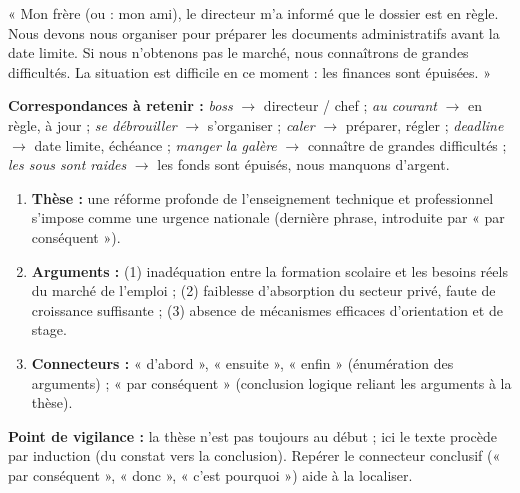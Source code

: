 \documentclass[11pt]{article}
\begin{document}
\begin{corrige}
« Mon frère (ou : mon ami), le directeur m'a informé que le dossier est en règle. Nous devons nous organiser pour préparer les documents administratifs avant la date limite. Si nous n'obtenons pas le marché, nous connaîtrons de grandes difficultés. La situation est difficile en ce moment : les finances sont épuisées. »

\textbf{Correspondances à retenir :} \emph{boss} $\rightarrow$ directeur / chef ; \emph{au courant} $\rightarrow$ en règle, à jour ; \emph{se débrouiller} $\rightarrow$ s'organiser ; \emph{caler} $\rightarrow$ préparer, régler ; \emph{deadline} $\rightarrow$ date limite, échéance ; \emph{manger la galère} $\rightarrow$ connaître de grandes difficultés ; \emph{les sous sont raides} $\rightarrow$ les fonds sont épuisés, nous manquons d'argent.
\end{corrige}

\begin{corrige}
\begin{enumerate}
    \item \textbf{Thèse :} une réforme profonde de l'enseignement technique et professionnel s'impose comme une urgence nationale (dernière phrase, introduite par « par conséquent »).
    \item \textbf{Arguments :} (1) inadéquation entre la formation scolaire et les besoins réels du marché de l'emploi ; (2) faiblesse d'absorption du secteur privé, faute de croissance suffisante ; (3) absence de mécanismes efficaces d'orientation et de stage.
    \item \textbf{Connecteurs :} « d'abord », « ensuite », « enfin » (énumération des arguments) ; « par conséquent » (conclusion logique reliant les arguments à la thèse).
\end{enumerate}
\textbf{Point de vigilance :} la thèse n'est pas toujours au début ; ici le texte procède par induction (du constat vers la conclusion). Repérer le connecteur conclusif (« par conséquent », « donc », « c'est pourquoi ») aide à la localiser.
\end{corrige}
\end{document}
